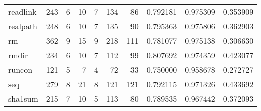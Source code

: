 \begin{tabular}{lrrrrrrrrr}
readlink  &                    243 &                                  6 &                                10 &                                7 &                               134 &                              86 &                                0.792181 &                               0.975309 &                             0.353909 \\
realpath  &                    248 &                                  6 &                                10 &                                7 &                               135 &                              90 &                                0.795363 &                               0.975806 &                             0.362903 \\
rm        &                    362 &                                  9 &                                15 &                                9 &                               218 &                             111 &                                0.781077 &                               0.975138 &                             0.306630 \\
rmdir     &                    234 &                                  6 &                                10 &                                7 &                               112 &                              99 &                                0.807692 &                               0.974359 &                             0.423077 \\
runcon    &                    121 &                                  5 &                                 7 &                                4 &                                72 &                              33 &                                0.750000 &                               0.958678 &                             0.272727 \\
seq       &                    279 &                                  8 &                                21 &                                8 &                               121 &                             121 &                                0.792115 &                               0.971326 &                             0.433692 \\
sha1sum   &                    215 &                                  7 &                                10 &                                5 &                               113 &                              80 &                                0.789535 &                               0.967442 &                             0.372093 \\

\end{tabular}

